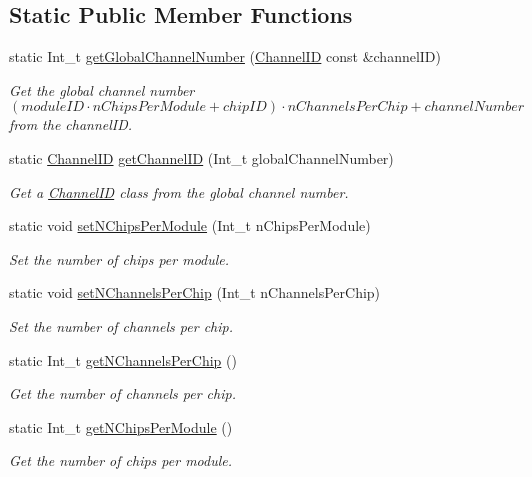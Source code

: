 \subsection*{Static Public Member Functions}
\begin{DoxyCompactItemize}
\item 
static Int\_\-t \hyperlink{class_spectrum_properties_run_info_a37a1ce79abc052318a89ada72699058c}{getGlobalChannelNumber} (\hyperlink{class_spectrum_properties_run_info_1_1_channel_i_d}{ChannelID} const \&channelID)
\begin{DoxyCompactList}\small\item\em Get the global channel number $( moduleID \cdot nChipsPerModule + chipID ) \cdot nChannelsPerChip + channelNumber $ from the channelID. \item\end{DoxyCompactList}\item 
static \hyperlink{class_spectrum_properties_run_info_1_1_channel_i_d}{ChannelID} \hyperlink{class_spectrum_properties_run_info_a0183a3e0b2724b37e0221aee0ef8195a}{getChannelID} (Int\_\-t globalChannelNumber)
\begin{DoxyCompactList}\small\item\em Get a \hyperlink{class_spectrum_properties_run_info_1_1_channel_i_d}{ChannelID} class from the global channel number. \item\end{DoxyCompactList}\item 
static void \hyperlink{class_spectrum_properties_run_info_a5436dc62d308bcbea52a034a001e1555}{setNChipsPerModule} (Int\_\-t nChipsPerModule)
\begin{DoxyCompactList}\small\item\em Set the number of chips per module. \item\end{DoxyCompactList}\item 
static void \hyperlink{class_spectrum_properties_run_info_aee98003379da6688bd2e2cfca86b8ebc}{setNChannelsPerChip} (Int\_\-t nChannelsPerChip)
\begin{DoxyCompactList}\small\item\em Set the number of channels per chip. \item\end{DoxyCompactList}\item 
static Int\_\-t \hyperlink{class_spectrum_properties_run_info_a3d9d8e0ae2cef40794561409120e257c}{getNChannelsPerChip} ()
\begin{DoxyCompactList}\small\item\em Get the number of channels per chip. \item\end{DoxyCompactList}\item 
static Int\_\-t \hyperlink{class_spectrum_properties_run_info_aaac273064e2d136ef58e589c677aec94}{getNChipsPerModule} ()
\begin{DoxyCompactList}\small\item\em Get the number of chips per module. \item\end{DoxyCompactList}\end{DoxyCompactItemize}
